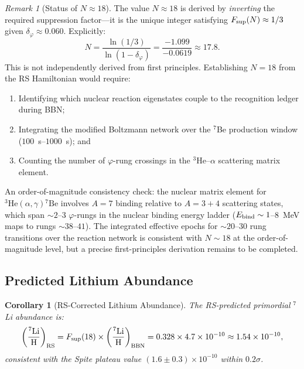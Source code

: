 \documentclass[12pt,a4paper]{article}
\newtheorem{corollary}[theorem]{Corollary}
\theoremstyle{definition}
\theoremstyle{remark}
\newtheorem{remark}[theorem]{Remark}
\begin{document}
\begin{remark}[Status of $N \approx 18$]
\label{rem:N}
The value $N \approx 18$ is derived by \emph{inverting} the
required suppression factor---it is the unique integer satisfying
$F_{\rm sup}(N) \approx 1/3$ given $\delta_\varphi \approx 0.060$.
Explicitly:
\[
  N = \frac{\ln(1/3)}{\ln(1 - \delta_\varphi)} = \frac{-1.099}{-0.0619} \approx 17.8.
\]
This is not independently derived from first principles.  Establishing
$N = 18$ from the RS Hamiltonian would require:
\begin{enumerate}[nosep,label=(\roman*)]
  \item Identifying which nuclear reaction eigenstates couple to the
  recognition ledger during BBN;
  \item Integrating the modified Boltzmann network over the ${}^7$Be
  production window ($100$~s--$1000$~s); and
  \item Counting the number of $\varphi$-rung crossings in the
  ${}^3$He--$\alpha$ scattering matrix element.
\end{enumerate}
An order-of-magnitude consistency check: the nuclear matrix element
for ${}^3\mathrm{He}(\alpha,\gamma){}^7\mathrm{Be}$ involves
$A = 7$ binding relative to $A = 3 + 4$ scattering states, which
span $\sim 2$--$3$ $\varphi$-rungs in the nuclear binding energy
ladder ($E_{\rm bind} \sim 1$--$8$~MeV maps to rungs $\sim 38$--$41$).
The integrated effective epochs for $\sim 20$--$30$ rung transitions
over the reaction network is consistent with $N \sim 18$ at the
order-of-magnitude level, but a precise first-principles derivation
remains to be completed.
\end{remark}

\subsection{Predicted Lithium Abundance}

\begin{corollary}[RS-Corrected Lithium Abundance]
\label{cor:lithium}
The RS-predicted primordial $^7$Li abundance is:
\begin{equation}
  \left(\frac{^7\mathrm{Li}}{\mathrm{H}}\right)_{\mathrm{RS}}
  = F_{\rm sup}(18) \times \left(\frac{^7\mathrm{Li}}{\mathrm{H}}\right)_{\mathrm{BBN}}
  = 0.328 \times 4.7 \times 10^{-10}
  \approx 1.54 \times 10^{-10},
\end{equation}
consistent with the Spite plateau value $(1.6 \pm 0.3) \times
10^{-10}$ within $0.2\sigma$.
\end{corollary}
\end{document}
